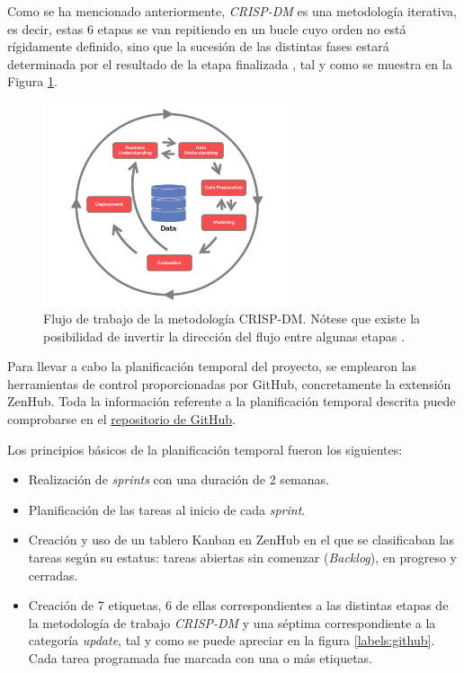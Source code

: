 Como se ha mencionado anteriormente, \textit{CRISP-DM} es una metodología iterativa, es decir, estas 6 etapas se van repitiendo en un bucle cuyo orden no está rígidamente definido, sino que la sucesión de las distintas fases estará determinada por el resultado de la etapa finalizada \cite{crispdm:niaksu}, tal y como se muestra en la Figura \ref{crispdm:flujo}.

\begin{figure}[h]
    \centering
    \includegraphics[width=0.65\textwidth]{img/CRISP-DM.png}
    \caption{Flujo de trabajo de la metodología CRISP-DM. Nótese que existe la posibilidad de invertir la dirección del flujo entre algunas etapas \cite{crispdm:flujo}.}
    \label{crispdm:flujo}
\end{figure}

Para llevar a cabo la planificación temporal del proyecto, se emplearon las herramientas de control proporcionadas por GitHub, concretamente la extensión ZenHub. Toda la información referente a la planificación temporal descrita puede comprobarse en el \href{https://github.com/SamuelLozanoJuarez/CNN_and_Diabetic_Retinopathy}{repositorio de GitHub}.

Los principios básicos de la planificación temporal fueron los siguientes:

\begin{itemize}[itemsep=0.1em]
    \item Realización de \textit{sprints} con una duración de 2 semanas.
    \item Planificación de las tareas al inicio de cada \textit{sprint}.
    \item Creación y uso de un tablero Kanban en ZenHub en el que se clasificaban las tareas según su estatus: tareas abiertas sin comenzar (\textit{Backlog}), en progreso y cerradas.
    \item Creación de 7 etiquetas, 6 de ellas correspondientes a las distintas etapas de la metodología de trabajo \textit{CRISP-DM} y una séptima correspondiente a la categoría \textit{update}, tal y como se puede apreciar en la figura \ref{labels:github}. Cada tarea programada fue marcada con una o más etiquetas.
\end{itemize}

